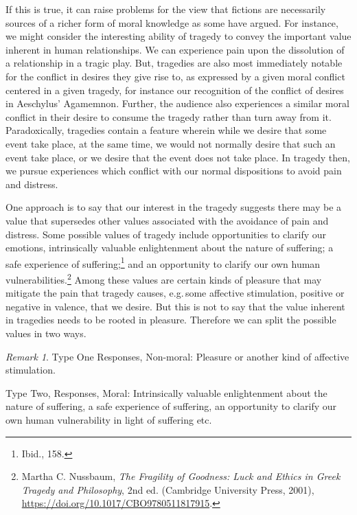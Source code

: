 \documentclass[
  12pt,
]{book}
\theoremstyle{definition}
\theoremstyle{definition}
\theoremstyle{definition}
\theoremstyle{definition}
\theoremstyle{remark}
\newtheorem*{remark}{Remark}
\begin{document}
If this is true, it can raise problems for the view that fictions are necessarily sources of a richer form of moral knowledge as some have argued. For instance, we might consider the interesting ability of tragedy to convey the important value inherent in human relationships. We can experience pain upon the dissolution of a relationship in a tragic play. But, tragedies are also most immediately notable for the conflict in desires they give rise to, as expressed by a given moral conflict centered in a given tragedy, for instance our recognition of the conflict of desires in Aeschylus' Agamemnon. Further, the audience also experiences a similar moral conflict in their desire to consume the tragedy rather than turn away from it. Paradoxically, tragedies contain a feature wherein while we desire that some event take place, at the same time, we would not normally desire that such an event take place, or we desire that the event does not take place. In tragedy then, we pursue experiences which conflict with our normal dispositions to avoid pain and distress.

One approach is to say that our interest in the tragedy suggests there may be a value that supersedes other values associated with the avoidance of pain and distress. Some possible values of tragedy include opportunities to clarify our emotions, intrinsically valuable enlightenment about the nature of suffering; a safe experience of suffering;\footnote{Ibid., 158.} and an opportunity to clarify our own human vulnerabilities.\footnote{Martha C. Nussbaum, \emph{The {Fragility} of {Goodness}: {Luck} and {Ethics} in {Greek Tragedy} and {Philosophy}}, 2nd ed. (Cambridge University Press, 2001), \url{https://doi.org/10.1017/CBO9780511817915}.} Among these values are certain kinds of pleasure that may mitigate the pain that tragedy causes, e.g.\,some affective stimulation, positive or negative in valence, that we desire. But this is not to say that the value inherent in tragedies needs to be rooted in pleasure. Therefore we can split the possible values in two ways.

\begin{remark}
Type One Responses, Non-moral: Pleasure or another kind of affective stimulation.

Type Two, Responses, Moral: Intrinsically valuable enlightenment about the nature of suffering, a safe experience of suffering, an opportunity to clarify our own human vulnerability in light of suffering etc.
\end{remark}
\end{document}
